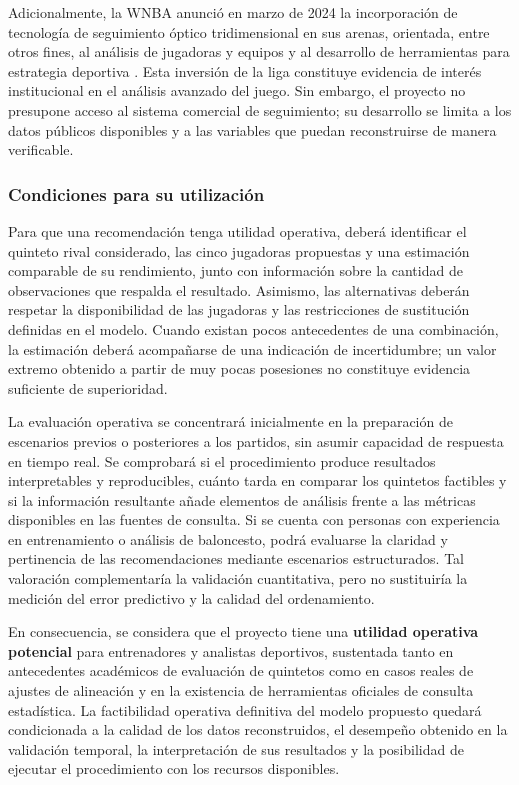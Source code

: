 Adicionalmente, la WNBA anunció en marzo de 2024 la incorporación de tecnología de seguimiento óptico tridimensional en sus arenas, orientada, entre otros fines, al análisis de jugadoras y equipos y al desarrollo de herramientas para estrategia deportiva \cite{wnba2024tracking}. Esta inversión de la liga constituye evidencia de interés institucional en el análisis avanzado del juego. Sin embargo, el proyecto no presupone acceso al sistema comercial de seguimiento; su desarrollo se limita a los datos públicos disponibles y a las variables que puedan reconstruirse de manera verificable.

\subsubsection*{Condiciones para su utilización}

Para que una recomendación tenga utilidad operativa, deberá identificar el quinteto rival considerado, las cinco jugadoras propuestas y una estimación comparable de su rendimiento, junto con información sobre la cantidad de observaciones que respalda el resultado. Asimismo, las alternativas deberán respetar la disponibilidad de las jugadoras y las restricciones de sustitución definidas en el modelo. Cuando existan pocos antecedentes de una combinación, la estimación deberá acompañarse de una indicación de incertidumbre; un valor extremo obtenido a partir de muy pocas posesiones no constituye evidencia suficiente de superioridad.

La evaluación operativa se concentrará inicialmente en la preparación de escenarios previos o posteriores a los partidos, sin asumir capacidad de respuesta en tiempo real. Se comprobará si el procedimiento produce resultados interpretables y reproducibles, cuánto tarda en comparar los quintetos factibles y si la información resultante añade elementos de análisis frente a las métricas disponibles en las fuentes de consulta. Si se cuenta con personas con experiencia en entrenamiento o análisis de baloncesto, podrá evaluarse la claridad y pertinencia de las recomendaciones mediante escenarios estructurados. Tal valoración complementaría la validación cuantitativa, pero no sustituiría la medición del error predictivo y la calidad del ordenamiento.

En consecuencia, se considera que el proyecto tiene una \textbf{utilidad operativa potencial} para entrenadores y analistas deportivos, sustentada tanto en antecedentes académicos de evaluación de quintetos como en casos reales de ajustes de alineación y en la existencia de herramientas oficiales de consulta estadística. La factibilidad operativa definitiva del modelo propuesto quedará condicionada a la calidad de los datos reconstruidos, el desempeño obtenido en la validación temporal, la interpretación de sus resultados y la posibilidad de ejecutar el procedimiento con los recursos disponibles.